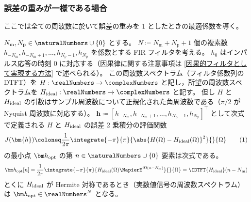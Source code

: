         \subsubsection{誤差の重みが一様である場合}
            \label{誤差の重みが一様である場合}
            \newcommand*{\Nm}{{N_\text{m}}}
            \newcommand*{\Np}{{N_\text{p}}}
            ここでは全ての周波数に於いて誤差の重みを 1 としたときの最適係数を導く。
            \begin{shadebox}
                $\Nm,\Np\in\naturalNumbers\cup\{0\}$ とする。
                $N\coloneq\Nm+\Np+1$ 個の複素数 $h_{-\Nm},h_{-\Nm+1},\dots,h_{\Np-1},h_\Np$ を係数とする FIR フィルタを考える。
                $h_0$ はインパルス応答の時刻 0 に対応する（因果律に関する注意事項は \ref{因果的フィルタとして実現する方法} で述べられる）。
                この周波数スペクトラム（フィルタ係数列の DTFT）を $H:\realNumbers\to\complexNumbers$ と記し，所望の周波数スペクトラムを $\Hideal:\realNumbers\to\complexNumbers$ と記す。
                但し $H$ と $H_\text{ideal}$ の引数はサンプル周波数について正規化された角周波数である（$\pi/2$ が Nyquist 周波数に対応する）。
                $\bm{h} \coloneq [h_{-\Nm},h_{-\Nm+1},\dots,h_{\Np-1},h_\Np]^\top$ として次式で定義される $H$ と $H_\text{ideal}$ の誤差 2 乗積分の評価関数
                \[ J(\bm{h}) \coloneq \frac{1}{2\pi}\integrate{-\pi}{\pi}{\abs{H(\Omega)-\Hideal(\Omega)}^2}{}{\Omega} \tag{1} \]
                の最小点 $\vhOpt$ の第 $n\in\naturalNumbers\cup\{0\}$ 要素は次式である。
                \[ \vhOpt[n] = \frac{1}{2\pi}\integrate{-\pi}{\pi}{\Hideal(\Omega)\NapierE^{i\Omega (n-\Nm)}}{}{\Omega} = \IDTFT{\Hideal}(n-\Nm) \]
                とくに $H_\text{ideal}$ が Hermite 対称であるとき（実数値信号の周波数スペクトラム）は $\vhOpt\in\realNumbers^N$ となる。
            \end{shadebox}
